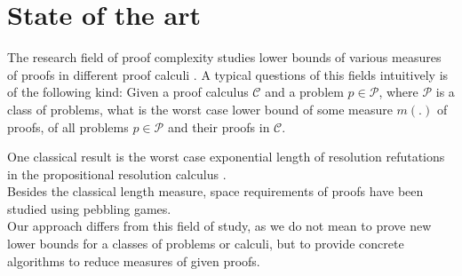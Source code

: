 \section{State of the art}

The research field of proof complexity studies lower bounds of various measures of proofs in different proof calculi \cite{TODO: modern approach to complexity?}. A typical questions of this fields intuitively is of the following kind: Given a proof calculus $\mathcal{C}$ and a problem $p \in \mathcal{P}$, where $\mathcal{P}$ is a class of problems, what is the worst case lower bound of some measure $m(.)$ of proofs, of all problems $p \in \mathcal{P}$ and their proofs in $\mathcal{C}$. %

One classical result is the worst case exponential length of resolution refutations in the propositional resolution calculus \cite{TODO: modern approach to complexity?}.\\
Besides the classical length measure, space requirements of proofs have been studied \cite{TODO: JAKOB NORDSTROM paper} using pebbling games.\\
Our approach differs from this field of study, as we do not mean to prove new lower bounds for a classes of problems or calculi, but to provide concrete algorithms to reduce measures of given proofs.

